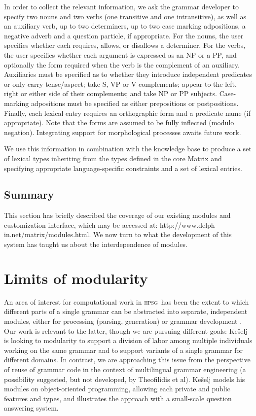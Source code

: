 \documentclass[11pt]{article}
\newcommand{\hpsg}{\textsc{hpsg}}
\begin{document}
In order to collect the relevant information, we ask the grammar
developer to specify two nouns and two verbs (one transitive and one
intransitive), as well as an auxiliary verb, up to two determiners, up
to two case marking adpositions, a negative adverb and a question
particle, if appropriate.  For the nouns, the user specifies whether
each requires, allows, or disallows a determiner.  For the verbs, the
user specifies whether each argument is expressed as an NP or a PP,
and optionally the form required when the verb is the complement of an
auxiliary.  Auxiliaries must be specified as to whether they introduce
independent predicates or only carry tense/aspect; take S, VP or V
complements; appear to the left, right or either side of their
complements; and take NP or PP subjects.  Case-marking adpositions
must be specified as either prepositions or postpositions.  Finally,
each lexical entry requires an orthographic form and a predicate name
(if appropriate).  Note that the forms are assumed to be fully
inflected (modulo negation).  Integrating support for morphological
processes awaits future work.

We use this information in combination with the knowledge
base to produce a set of lexical types inheriting from the types
defined in the core Matrix and specifying appropriate
language-specific constraints and a set of lexical entries.

\subsection{Summary}

This section has briefly described the coverage of our existing
modules and customization interface, which may be accessed at:
http://www.delph-in.net/matrix/modules.html. We now turn to 
what the development of this system has taught us about the
interdependence of modules.

\section{Limits of modularity}

An area of interest for computational work in \hpsg\ has been the
extent to which different parts of a single grammar can be abstracted
into separate, independent modules, either for processing (parsing,
generation) \cite{Kasper:Krieger:96,Theofilidis:etal:97} or grammar
development \cite{Keselj:01}.  Our work is relevant to the latter,
though we are pursuing different goals: Ke{\v{s}}elj\nocite{Keselj:01}
is looking to modularity to support a division of labor among multiple
individuals working on the same grammar and to support variants of a
single grammar for different domains.  In contrast, we are approaching
this issue from the perspective of reuse of grammar code in the
context of multilingual grammar engineering (a possibility suggested,
but not developed, by Theofilidis et al).
Ke{\v{s}}elj\nocite{Keselj:01} models his modules on object-oriented
programming, allowing each private and public features and types, and
illustrates the approach with a small-scale question answering system.
\end{document}
